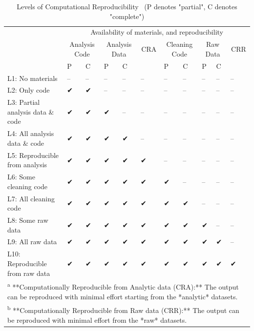 \documentclass[]{book}
\begin{document}
\begin{table}

\caption{\label{tab:levels-of-computational-reproducibility}Levels of Computational Reproducibility \
 (P denotes "partial", C denotes "complete")}
\centering
\begin{tabular}[t]{l|l|l|l|l|l|l|l|l|l|l}
\hline
\multicolumn{1}{c|}{ } & \multicolumn{10}{c}{Availability of materials, and reproducibility} \\
\cline{2-11}
\multicolumn{1}{c|}{ } & \multicolumn{2}{c|}{Analysis Code} & \multicolumn{2}{c|}{Analysis Data} & \multicolumn{1}{c|}{CRA} & \multicolumn{2}{c|}{Cleaning Code} & \multicolumn{2}{c|}{Raw Data} & \multicolumn{1}{c}{CRR} \\
\cline{2-3} \cline{4-5} \cline{6-6} \cline{7-8} \cline{9-10} \cline{11-11}
  & P & C & P & C &   & P & C & P & C &  \\
\hline
L1: No materials & -- & -- & -- & -- & -- & -- & -- & -- & -- & --\\
\hline
L2: Only code & ✔ & ✔ & -- & -- & -- & -- & -- & -- & -- & --\\
\hline
L3: Partial analysis data \& code & ✔ & ✔ & ✔ & -- & -- & -- & -- & -- & -- & --\\
\hline
L4: All analysis data \& code & ✔ & ✔ & ✔ & ✔ & -- & -- & -- & -- & -- & --\\
\hline
L5: Reproducible from analysis & ✔ & ✔ & ✔ & ✔ & ✔ & -- & -- & -- & -- & --\\
\hline
L6: Some cleaning code & ✔ & ✔ & ✔ & ✔ & ✔ & ✔ & -- & -- & -- & --\\
\hline
L7: All cleaning code & ✔ & ✔ & ✔ & ✔ & ✔ & ✔ & ✔ & -- & -- & --\\
\hline
L8: Some raw data & ✔ & ✔ & ✔ & ✔ & ✔ & ✔ & ✔ & ✔ & -- & --\\
\hline
L9: All raw data & ✔ & ✔ & ✔ & ✔ & ✔ & ✔ & ✔ & ✔ & ✔ & --\\
\hline
L10: Reproducible from raw data & ✔ & ✔ & ✔ & ✔ & ✔ & ✔ & ✔ & ✔ & ✔ & ✔\\
\hline
\multicolumn{11}{l}{\textsuperscript{a} **Computationally Reproducible from Analytic data (CRA):** The output can be reproduced with minimal effort starting from the *analytic* datasets.}\\
\multicolumn{11}{l}{\textsuperscript{b} **Computationally Reproducible from Raw data (CRR):** The output can be reproduced with minimal effort from the *raw* datasets.}\\
\end{tabular}
\end{table}
\end{document}
